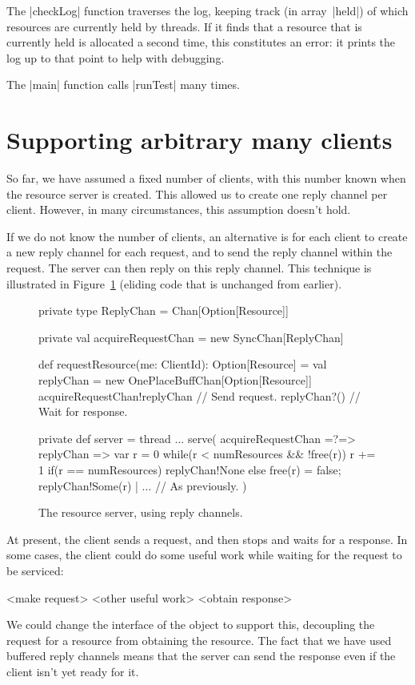 
The |checkLog| function traverses the log, keeping track (in array~|held|) of
which resources are currently held by threads.  If it finds that a resource
that is currently held is allocated a second time, this constitutes an error:
it prints the log up to that point to help with debugging.

The |main| function calls |runTest| many times. 


\section{Supporting arbitrary many clients}

So far, we have assumed a fixed number of clients, with this number known when
the resource server is created.  This allowed us to create one reply channel
per client.  However, in many circumstances, this assumption doesn't hold.

If we do not know the number of clients, an alternative is for each client to
create a new reply channel for each request, and to send the reply channel
within the request.  The server can then reply on this reply channel.  
%
This technique is illustrated in Figure~\ref{fig:RAServer-replyChan} (eliding
code that is unchanged from earlier). 


\begin{figure}
\begin{scala}
  private type ReplyChan = Chan[Option[Resource]]

  private val acquireRequestChan = new SyncChan[ReplyChan]

  def requestResource(me: ClientId): Option[Resource] = {
    val replyChan = new OnePlaceBuffChan[Option[Resource]]
    acquireRequestChan!replyChan  // Send request.
    replyChan?() // Wait for response.
  }

  private def server = thread{
    ...
    serve(
      acquireRequestChan =?=> { replyChan => 
	var r = 0
	while(r < numResources && !free(r)) r += 1
	if(r == numResources) replyChan!None
        else{ free(r) = false; replyChan!Some(r) }
      }
      | ... // As previously. 
    )
  }
\end{scala}
\caption{The resource server, using reply channels.}
\label{fig:RAServer-replyChan}
\end{figure}


At present, the client sends a request, and then stops and waits for a
response.
%
In some cases, the client could do some useful work while waiting for the
request to be serviced:
%
\begin{scala}
  <make request>
  <other useful work>
  <obtain response>
\end{scala}
%
We could change the interface of the object to support this, decoupling the
request for a resource from obtaining the resource.
%
The fact that we have used buffered reply channels means that the server can
send the response even if the client isn't yet ready for it.  

